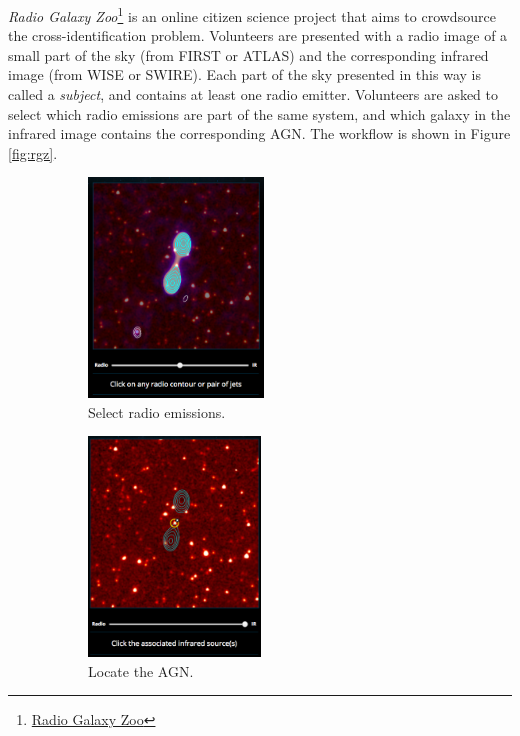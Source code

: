 \documentclass[a4paper]{article}
\newcommand{\fig}{Figure }
\begin{document}
      \emph{Radio Galaxy Zoo}\footnote{\href{http://radio.galaxyzoo.org/}{Radio Galaxy Zoo}} is an online citizen science project that aims to crowdsource the cross-identification problem\cite{banfield15}. Volunteers are presented with a radio image of a small part of the sky (from FIRST or ATLAS) and the corresponding infrared image (from WISE or SWIRE). Each part of the sky presented in this way is called a \emph{subject}, and contains at least one radio emitter. Volunteers are asked to select which radio emissions are part of the same system, and which galaxy in the infrared image contains the corresponding AGN. The workflow is shown in \fig \ref{fig:rgz}.

      \begin{figure}[!ht]
        \centering
          \begin{subfigure}{0.3\textwidth}
            \includegraphics[width=\linewidth, height=2.3in]{images/rgz_radio.png}
            \caption{Select radio emissions.}
          \end{subfigure}
          \quad
          \begin{subfigure}{0.3\textwidth}
            \includegraphics[width=\linewidth, height=2.3in]{images/rgz_ir.png}
            \caption{Locate the AGN.}
          \end{subfigure}
          \quad
          \begin{subfigure}{0.3\textwidth}

\end{subfigure}
\end{figure}
\end{document}
